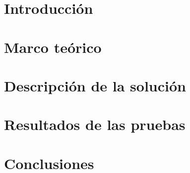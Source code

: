 \documentclass[10pt,a4paper]{article}
\begin{document}
\pagebreak
\section{Introducción}
\bigskip
\bigskip 


\pagebreak
\section{Marco teórico}

\pagebreak
\section{Descripción de la solución}

\pagebreak
\section{Resultados de las pruebas}

\pagebreak
\section{Conclusiones}
\end{document}
